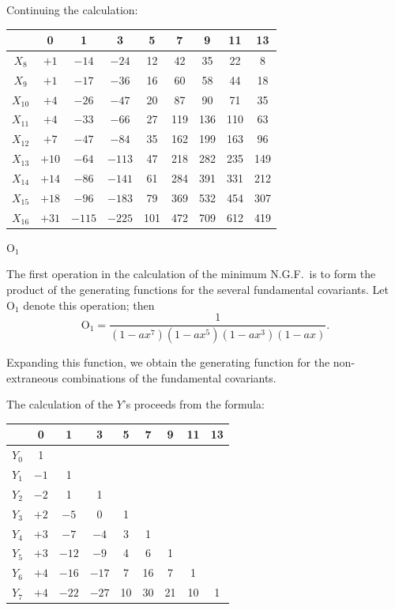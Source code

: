 \documentclass[11pt,a4paper]{article}
\begin{document}
\clearpage
Continuing the calculation:

\begin{center}
\begin{tabular}{c|cccccccc}
& 0 & 1 & 3 & 5 & 7 & 9 & 11 & 13 \\
\hline
$X_8$ & $+1$ & $-14$ & $-24$ & 12 & 42 & 35 & 22 & 8 \\
$X_9$ & $+1$ & $-17$ & $-36$ & 16 & 60 & 58 & 44 & 18 \\
$X_{10}$ & $+4$ & $-26$ & $-47$ & 20 & 87 & 90 & 71 & 35 \\
$X_{11}$ & $+4$ & $-33$ & $-66$ & 27 & 119 & 136 & 110 & 63 \\
$X_{12}$ & $+7$ & $-47$ & $-84$ & 35 & 162 & 199 & 163 & 96 \\
$X_{13}$ & $+10$ & $-64$ & $-113$ & 47 & 218 & 282 & 235 & 149 \\
$X_{14}$ & $+14$ & $-86$ & $-141$ & 61 & 284 & 391 & 331 & 212 \\
$X_{15}$ & $+18$ & $-96$ & $-183$ & 79 & 369 & 532 & 454 & 307 \\
$X_{16}$ & $+31$ & $-115$ & $-225$ & 101 & 472 & 709 & 612 & 419
\end{tabular}
\end{center}

\clearpage
$\mathrm{O}_1$

The first operation in the calculation of the minimum N.G.F.\ is to form the product of the generating functions for the several fundamental covariants. Let $\mathrm{O}_1$ denote this operation; then
\[
\mathrm{O}_1 = \frac{1}{(1 - ax^7)(1 - ax^5)(1 - ax^3)(1 - ax)}.
\]

Expanding this function, we obtain the generating function for the non-extraneous combinations of the fundamental covariants.

The calculation of the $Y$'s proceeds from the formula:

\begin{center}
\begin{tabular}{c|cccccccc}
& 0 & 1 & 3 & 5 & 7 & 9 & 11 & 13 \\
\hline
$Y_0$ & 1 & & & & & & & \\
$Y_1$ & $-1$ & 1 & & & & & & \\
$Y_2$ & $-2$ & 1 & 1 & & & & & \\
$Y_3$ & $+2$ & $-5$ & 0 & 1 & & & & \\
$Y_4$ & $+3$ & $-7$ & $-4$ & 3 & 1 & & & \\
$Y_5$ & $+3$ & $-12$ & $-9$ & 4 & 6 & 1 & & \\
$Y_6$ & $+4$ & $-16$ & $-17$ & 7 & 16 & 7 & 1 & \\
$Y_7$ & $+4$ & $-22$ & $-27$ & 10 & 30 & 21 & 10 & 1
\end{tabular}
\end{center}
\end{document}
